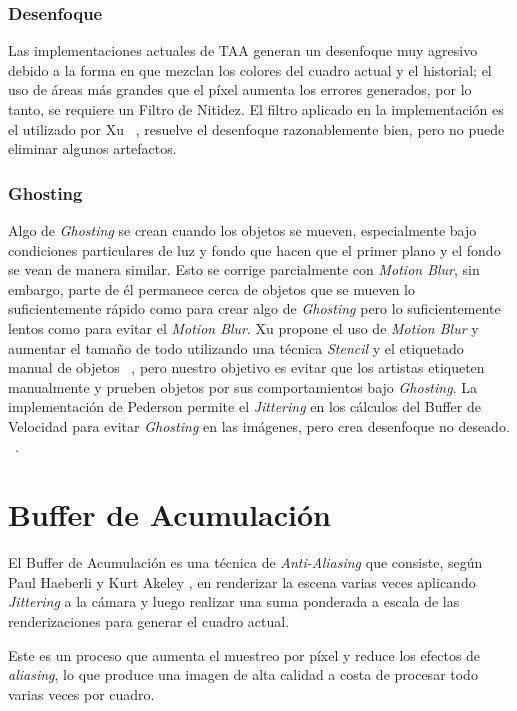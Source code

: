 \documentclass{cslthse-msc}
\begin{document}
\subsubsection{Desenfoque} 
Las implementaciones actuales de TAA generan un desenfoque muy agresivo debido a la forma en que mezclan los colores del cuadro actual y el historial; el uso de áreas más grandes que el píxel aumenta los errores generados, por lo tanto, se requiere un Filtro de Nitidez. El filtro aplicado en la implementación es el utilizado por Xu ~\cite{XU2016}, resuelve el desenfoque razonablemente bien, pero no puede eliminar algunos artefactos. 

\subsubsection{Ghosting} 
Algo de \textit{Ghosting} se crean cuando los objetos se mueven, especialmente bajo condiciones particulares de luz y fondo que hacen que el primer plano y el fondo se vean de manera similar. Esto se corrige parcialmente con \textit{Motion Blur}, sin embargo, parte de él permanece cerca de objetos que se mueven lo suficientemente rápido como para crear algo de \textit{Ghosting} pero lo suficientemente lentos como para evitar el \textit{Motion Blur}. Xu propone el uso de \textit{Motion Blur} y aumentar el tamaño de todo utilizando una técnica \textit{Stencil} y el etiquetado manual de objetos ~\cite{XU2016}, pero nuestro objetivo es evitar que los artistas etiqueten manualmente y prueben objetos por sus comportamientos bajo \textit{Ghosting}. La implementación de Pederson permite el \textit{Jittering} en los cálculos del Buffer de Velocidad para evitar \textit{Ghosting} en las imágenes, pero crea desenfoque no deseado. ~\cite{Fuglsand2016}. 

\section{Buffer de Acumulación}
El Buffer de Acumulación es una técnica de \textit{Anti-Aliasing} que consiste, según Paul Haeberli y Kurt Akeley \cite{Haeberli1990}, en renderizar la escena varias veces aplicando \textit{Jittering} a la cámara y luego realizar una suma ponderada a escala de las renderizaciones para generar el cuadro actual.

Este es un proceso que aumenta el muestreo por píxel y reduce los efectos de \textit{aliasing}, lo que produce una imagen de alta calidad a costa de procesar todo varias veces por cuadro.
\end{document}
